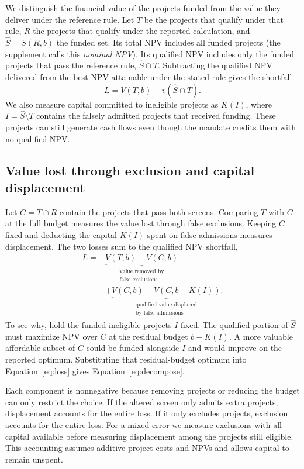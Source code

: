 We distinguish the financial value of the projects funded from the value they deliver under the reference rule. Let $T$ be the projects that qualify under that rule, $R$ the projects that qualify under the reported calculation, and $\widehat S=S(R,b)$ the funded set. Its total NPV includes all funded projects (the supplement calls this \emph{nominal NPV}). Its qualified NPV includes only the funded projects that pass the reference rule, $\widehat S\cap T$. Subtracting the qualified NPV delivered from the best NPV attainable under the stated rule gives the shortfall
\begin{equation}
 L=V(T,b)-v(\widehat S\cap T). \label{eq:loss}
\end{equation}
We also measure capital committed to ineligible projects as $K(I)$, where $I=\widehat S\setminus T$ contains the falsely admitted projects that received funding. These projects can still generate cash flows even though the mandate credits them with no qualified NPV.

\subsection{Value lost through exclusion and capital displacement}
Let $C=T\cap R$ contain the projects that pass both screens. Comparing $T$ with $C$ at the full budget measures the value lost through false exclusions. Keeping $C$ fixed and deducting the capital $K(I)$ spent on false admissions measures displacement. The two losses sum to the qualified NPV shortfall,
\begin{equation}
\begin{aligned}
L={}&\underbrace{V(T,b)-V(C,b)}_{\substack{\text{value removed by}\\\text{false exclusions}}}\\
&+\underbrace{V(C,b)-V(C,b-K(I))}_{\substack{\text{qualified value displaced}\\\text{by false admissions}}} .
\end{aligned}
\label{eq:decompose}
\end{equation}
To see why, hold the funded ineligible projects $I$ fixed. The qualified portion of $\widehat S$ must maximize NPV over $C$ at the residual budget $b-K(I)$. A more valuable affordable subset of $C$ could be funded alongside $I$ and would improve on the reported optimum. Substituting that residual-budget optimum into Equation~\eqref{eq:loss} gives Equation~\eqref{eq:decompose}.

Each component is nonnegative because removing projects or reducing the budget can only restrict the choice. If the altered screen only admits extra projects, displacement accounts for the entire loss. If it only excludes projects, exclusion accounts for the entire loss. For a mixed error we measure exclusions with all capital available before measuring displacement among the projects still eligible. This accounting assumes additive project costs and NPVs and allows capital to remain unspent.

